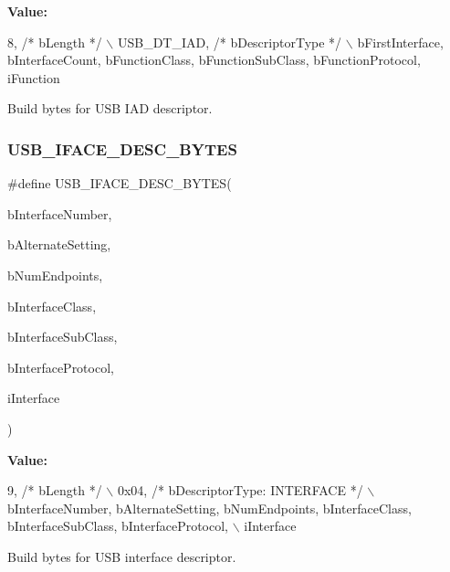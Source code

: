 {\bfseries Value\+:}
\begin{DoxyCode}
8,              \textcolor{comment}{/* bLength */}                                                                              
              \(\backslash\)
        USB\_DT\_IAD, \textcolor{comment}{/* bDescriptorType */}                                                                  
                  \(\backslash\)
        bFirstInterface, bInterfaceCount, bFunctionClass, bFunctionSubClass, bFunctionProtocol, iFunction
\end{DoxyCode}
Build bytes for U\+SB I\+AD descriptor. \mbox{\label{group__usb__protocol__group_gabf60119d96399470a7caaac30e8f3df8}} 
\subsubsection{\texorpdfstring{U\+S\+B\+\_\+\+I\+F\+A\+C\+E\+\_\+\+D\+E\+S\+C\+\_\+\+B\+Y\+T\+ES}{USB\_IFACE\_DESC\_BYTES}}
{\footnotesize\ttfamily \#define U\+S\+B\+\_\+\+I\+F\+A\+C\+E\+\_\+\+D\+E\+S\+C\+\_\+\+B\+Y\+T\+ES(\begin{DoxyParamCaption}\item[{}]{b\+Interface\+Number,  }\item[{}]{b\+Alternate\+Setting,  }\item[{}]{b\+Num\+Endpoints,  }\item[{}]{b\+Interface\+Class,  }\item[{}]{b\+Interface\+Sub\+Class,  }\item[{}]{b\+Interface\+Protocol,  }\item[{}]{i\+Interface }\end{DoxyParamCaption})}

{\bfseries Value\+:}
\begin{DoxyCode}
9,        \textcolor{comment}{/* bLength */}                                                                                    
              \(\backslash\)
        0x04, \textcolor{comment}{/* bDescriptorType: INTERFACE */}                                                             
                  \(\backslash\)
        bInterfaceNumber, bAlternateSetting, bNumEndpoints, bInterfaceClass, bInterfaceSubClass, 
      bInterfaceProtocol,   \(\backslash\)
        iInterface
\end{DoxyCode}
Build bytes for U\+SB interface descriptor. \mbox{\label{group__usb__protocol__group_ga02a0c7d30f1a625db822e3a43f628a7b}} 

